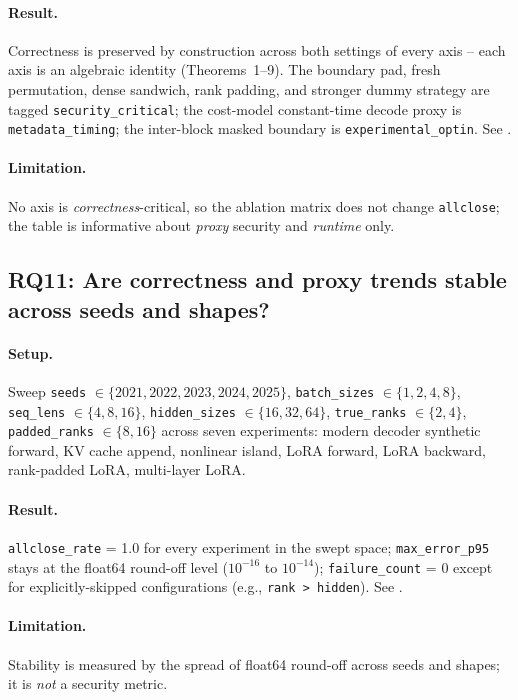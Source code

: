\paragraph{Result.} Correctness is preserved by construction across both settings of every axis -- each axis is an algebraic identity (Theorems~1--9). The boundary pad, fresh permutation, dense sandwich, rank padding, and stronger dummy strategy are tagged \texttt{security\_critical}; the cost-model constant-time decode proxy is \texttt{metadata\_timing}; the inter-block masked boundary is \texttt{experimental\_optin}. See .

\paragraph{Limitation.} No axis is \emph{correctness}-critical, so the ablation matrix does not change \texttt{allclose}; the table is informative about \emph{proxy} security and \emph{runtime} only.



\subsection{RQ11: Are correctness and proxy trends stable across seeds and shapes?}
\label{sec:eval:rq11}
\paragraph{Setup.} Sweep \texttt{seeds} $\in \{2021, 2022, 2023, 2024, 2025\}$, \texttt{batch\_sizes} $\in \{1, 2, 4, 8\}$, \texttt{seq\_lens} $\in \{4, 8, 16\}$, \texttt{hidden\_sizes} $\in \{16, 32, 64\}$, \texttt{true\_ranks} $\in \{2, 4\}$, \texttt{padded\_ranks} $\in \{8, 16\}$ across seven experiments: modern decoder synthetic forward, KV cache append, nonlinear island, LoRA forward, LoRA backward, rank-padded LoRA, multi-layer LoRA.

\paragraph{Result.} \texttt{allclose\_rate} = 1.0 for every experiment in the swept space; \texttt{max\_error\_p95} stays at the float64 round-off level ($10^{-16}$ to $10^{-14}$); \texttt{failure\_count} = 0 except for explicitly-skipped configurations (e.g., \texttt{rank > hidden}). See .

\paragraph{Limitation.} Stability is measured by the spread of float64 round-off across seeds and shapes; it is \emph{not} a security metric.

